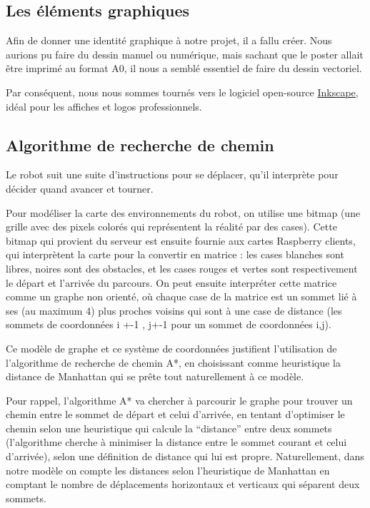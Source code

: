 \documentclass[a4paper,12pt]{report}  %
\begin{document}
\subsection{Les éléments graphiques}

Afin de donner une identité graphique à notre projet, il a fallu créer. Nous aurions pu faire du dessin manuel ou numérique, mais sachant que le poster allait être imprimé au format A0, il nous a semblé essentiel de faire du dessin vectoriel. 

Par conséquent, nous nous sommes tournés vers le logiciel open-source \href{https://flathub.org/apps/org.inkscape.Inkscape}{Inkscape}, idéal pour les affiches et logos professionnels. 

\subsection{Algorithme de recherche de chemin}
Le robot suit une suite d’instructions pour se déplacer, qu’il interprète pour décider quand avancer et tourner.

Pour modéliser la carte des environnements du robot, on utilise une bitmap (une grille avec des pixels colorés qui représentent la réalité par des cases). Cette bitmap qui provient du serveur est ensuite fournie aux cartes Raspberry clients, qui interprètent la carte pour la convertir en matrice : les cases blanches sont libres, noires sont des obstacles, et les cases rouges et vertes sont respectivement le départ et l’arrivée du parcours. On peut ensuite interpréter cette matrice comme un graphe non orienté, où chaque case de la matrice est un sommet lié à ses (au maximum 4) plus proches voisins qui sont à une case de distance (les sommets de coordonnées i +-1 , j+-1 pour un sommet de coordonnées i,j).

Ce modèle de graphe et ce système de coordonnées justifient l’utilisation de l’algorithme de recherche de chemin A*, en choisissant comme heuristique la distance de Manhattan qui se prête tout naturellement à ce modèle.

Pour rappel, l’algorithme A* va chercher à parcourir le graphe pour trouver un chemin entre le sommet de départ et celui d’arrivée, en tentant d’optimiser le chemin selon une heuristique qui calcule la “distance” entre deux sommets (l’algorithme cherche à minimiser la distance entre le sommet courant et celui d’arrivée), selon une définition de distance qui lui est propre. Naturellement, dans notre modèle on compte les distances selon l’heuristique de Manhattan en comptant le nombre de déplacements horizontaux et verticaux qui séparent deux sommets.
\end{document}
